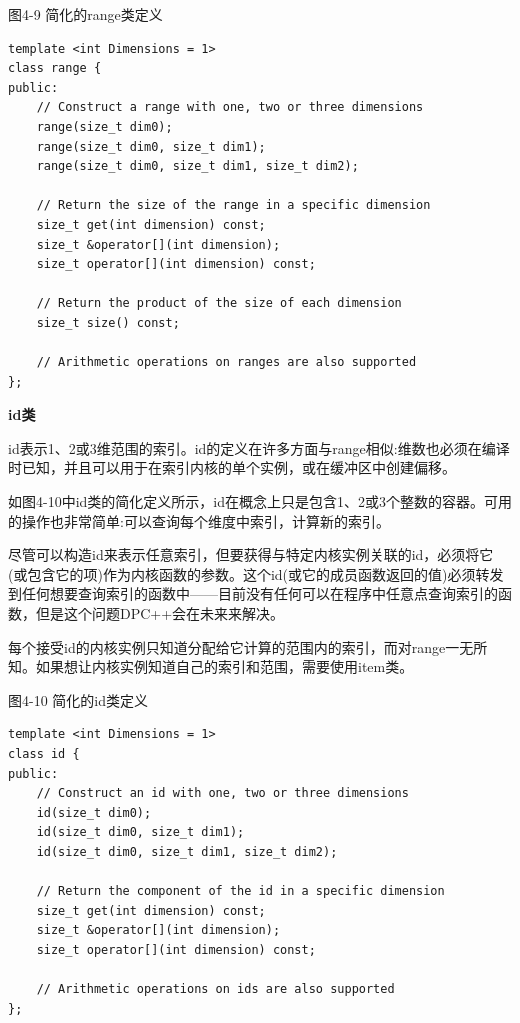 \hspace*{\fill} \par %
图4-9 简化的range类定义
\begin{lstlisting}[caption={}]
template <int Dimensions = 1>
class range {
public:
	// Construct a range with one, two or three dimensions
	range(size_t dim0);
	range(size_t dim0, size_t dim1);
	range(size_t dim0, size_t dim1, size_t dim2);
	
	// Return the size of the range in a specific dimension 
	size_t get(int dimension) const;
	size_t &operator[](int dimension);
	size_t operator[](int dimension) const;
	
	// Return the product of the size of each dimension
	size_t size() const;
	
	// Arithmetic operations on ranges are also supported
};
\end{lstlisting}

\hspace*{\fill} \par %
\textbf{id类}

id表示1、2或3维范围的索引。id的定义在许多方面与range相似:维数也必须在编译时已知，并且可以用于在索引内核的单个实例，或在缓冲区中创建偏移。\par

如图4-10中id类的简化定义所示，id在概念上只是包含1、2或3个整数的容器。可用的操作也非常简单:可以查询每个维度中索引，计算新的索引。\par

尽管可以构造id来表示任意索引，但要获得与特定内核实例关联的id，必须将它(或包含它的项)作为内核函数的参数。这个id(或它的成员函数返回的值)必须转发到任何想要查询索引的函数中——目前没有任何可以在程序中任意点查询索引的函数，但是这个问题DPC++会在未来来解决。\par

每个接受id的内核实例只知道分配给它计算的范围内的索引，而对range一无所知。如果想让内核实例知道自己的索引和范围，需要使用item类。\par

\hspace*{\fill} \par %
图4-10 简化的id类定义
\begin{lstlisting}[caption={}]
template <int Dimensions = 1>
class id {
public:
	// Construct an id with one, two or three dimensions
	id(size_t dim0);
	id(size_t dim0, size_t dim1);
	id(size_t dim0, size_t dim1, size_t dim2);
	
	// Return the component of the id in a specific dimension 
	size_t get(int dimension) const;
	size_t &operator[](int dimension);
	size_t operator[](int dimension) const;
	
	// Arithmetic operations on ids are also supported
};
\end{lstlisting}

